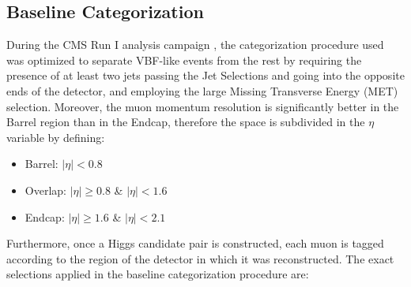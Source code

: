 \subsection{Baseline Categorization}
During the CMS Run I analysis campaign \cite{CMSHiggsRunI}, the categorization procedure used was optimized to separate VBF-like events from the rest by requiring the presence of at least two jets passing the Jet Selections and going into the opposite ends of the detector, and employing the large Missing Transverse Energy (MET) selection. Moreover, the muon momentum resolution is significantly better in the Barrel region than in the Endcap, therefore the space is subdivided in the $\eta$ variable by defining:
\begin{itemize}
  \item Barrel: $|\eta| < 0.8$
  \item Overlap: $|\eta| \ge 0.8$ \& $|\eta| < 1.6$
  \item Endcap: $|\eta| \ge 1.6$ \& $|\eta| < 2.1$
\end{itemize}
Furthermore, once a Higgs candidate pair is constructed, each muon is tagged according to the region of the detector in which it was reconstructed. The exact selections applied in the baseline categorization procedure are:
